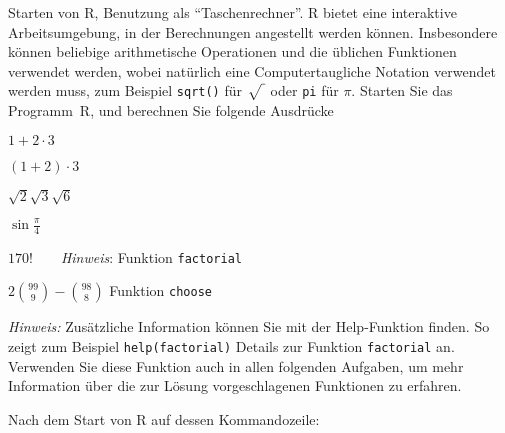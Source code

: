 Starten von R, Benutzung als ``Taschenrechner''.
R bietet eine interaktive Arbeitsumgebung, in der Berechnungen angestellt
werden können. Insbesondere können beliebige arithmetische Operationen
und die üblichen Funktionen verwendet werden, wobei natürlich eine
Computertaugliche Notation verwendet werden muss, zum Beispiel
{\tt sqrt()} für $\sqrt{\mathstrut\;}$ oder {\tt pi} für $\pi$.
Starten Sie das Programm~R, und berechnen Sie folgende Ausdrücke
\begin{teilaufgaben}
\item $1+2\cdot 3$
\item $(1+2)\cdot 3$
\item $\sqrt{2}\sqrt{3}\sqrt{6}$
\item $\sin \frac{\pi}4$
\item $170!\qquad${\it Hinweis\/}: Funktion {\tt factorial}
\item $2\binom{99}{9}-\binom{98}{8}$  Funktion {\tt choose}
\end{teilaufgaben}
{\it Hinweis\/:} Zusätzliche Information können Sie mit der Help-Funktion
finden. So zeigt zum Beispiel {\tt help(factorial)} Details zur Funktion
{\tt factorial} an. Verwenden Sie diese Funktion auch in allen folgenden
Aufgaben, um mehr Information über die zur Lösung vorgeschlagenen
Funktionen zu erfahren.

\begin{loesung}
Nach dem Start von R auf dessen Kommandozeile:
\end{loesung}

